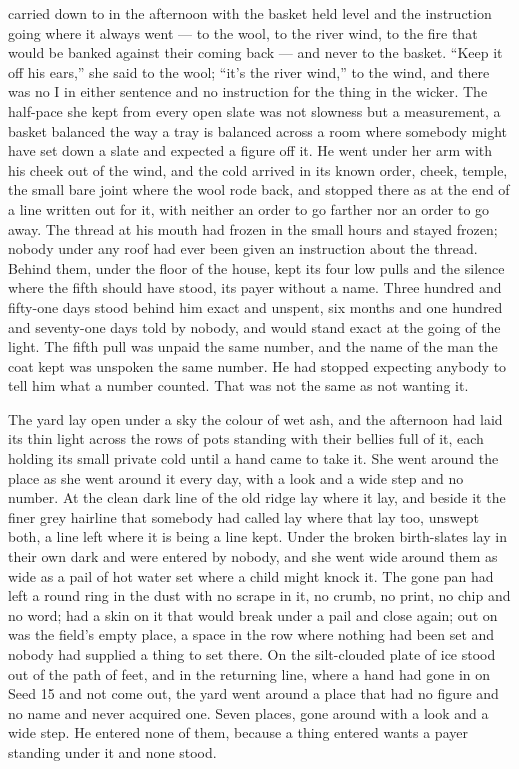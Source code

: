  carried  down to  in the afternoon with the basket held level and the instruction going where it always went --- to the wool, to the river wind, to the fire that would be banked against their coming back --- and never to the basket. “Keep it off his ears,” she said to the wool; “it’s the river wind,” to the wind, and there was no I in either sentence and no instruction for the thing in the wicker. The half-pace she kept from every open slate was not slowness but a measurement, a basket balanced the way a tray is balanced across a room where somebody might have set down a slate and expected a figure off it. He went under her arm with his cheek out of the wind, and the cold arrived in its known order, cheek, temple, the small bare joint where the wool rode back, and stopped there as at the end of a line written out for it, with neither an order to go farther nor an order to go away. The thread at his mouth had frozen in the small hours and stayed frozen; nobody under any roof had ever been given an instruction about the thread. Behind them, under the floor of the house,  kept its four low pulls and the silence where the fifth should have stood, its payer without a name. Three hundred and fifty-one days stood behind him exact and unspent, six months and one hundred and seventy-one days told by nobody, and would stand exact at the going of the light. The fifth pull was unpaid the same number, and the name of the man the coat kept was unspoken the same number. He had stopped expecting anybody to tell him what a number counted. That was not the same as not wanting it.

The yard lay open under a sky the colour of wet ash, and the afternoon had laid its thin light across the rows of pots standing with their bellies full of it, each holding its small private cold until a hand came to take it. She went around the place as she went around it every day, with a look and a wide step and no number. At  the clean dark line of the old  ridge lay where it lay, and beside it the finer grey hairline that somebody had called  lay where that lay too, unswept both, a line left where it is being a line kept. Under  the broken birth-slates lay in their own dark and were entered by nobody, and she went wide around them as wide as a pail of hot water set where a child might knock it. The gone pan had left a round ring in the dust with no scrape in it, no crumb, no print, no chip and no word;  had a skin on it that would break under a pail and close again; out on  was the field’s empty place, a space in the row where nothing had been set and nobody had supplied a thing to set there. On  the silt-clouded plate of ice stood out of the path of feet, and in the returning line, where a hand had gone in on Seed 15 and not come out, the yard went around a place that had no figure and no name and never acquired one. Seven places, gone around with a look and a wide step. He entered none of them, because a thing entered wants a payer standing under it and none stood.

